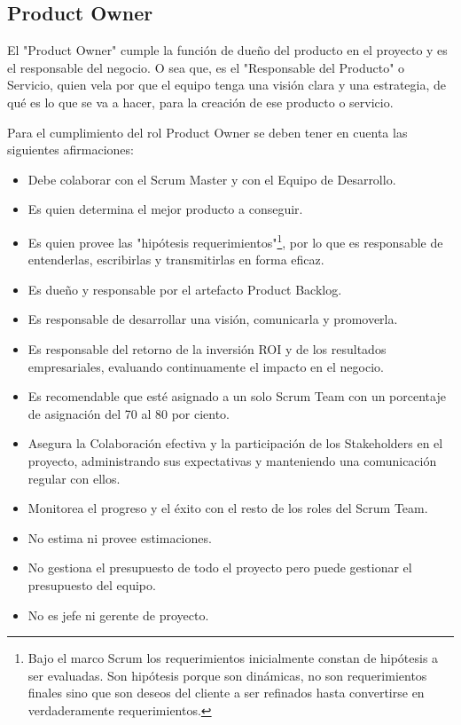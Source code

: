 \subsection{Product Owner}

El "Product Owner" cumple la función de dueño del producto en el proyecto y es el responsable del negocio. O sea que, es el "Responsable del Producto" o Servicio, quien vela por que el equipo tenga una visión clara y una estrategia, de qué es lo que se va a hacer, para la creación de ese producto o servicio.

Para el cumplimiento del rol Product Owner se deben tener en cuenta las siguientes afirmaciones:

\begin{itemize}
\item Debe colaborar con el Scrum Master y con el Equipo de Desarrollo.
\item Es quien determina el mejor producto a conseguir.
\item Es quien provee las "hipótesis requerimientos"\footnote{Bajo el marco Scrum los requerimientos inicialmente constan de hipótesis a ser evaluadas. Son hipótesis porque son dinámicas, no son requerimientos finales sino que son deseos del cliente a ser refinados hasta convertirse en verdaderamente requerimientos.}, por lo que es responsable de entenderlas, escribirlas y transmitirlas en forma eficaz.
\item Es dueño y responsable por el artefacto Product Backlog.
\item Es responsable de desarrollar una visión, comunicarla y promoverla.
\item Es responsable del retorno de la inversión ROI y de los resultados empresariales, evaluando continuamente el impacto en el negocio.
\item Es recomendable que esté asignado a un solo Scrum Team con un porcentaje de asignación del 70 al 80 por ciento.
\item Asegura la Colaboración efectiva y la participación de los Stakeholders en el proyecto, administrando sus expectativas y manteniendo una comunicación regular con ellos.
\item Monitorea el progreso y el éxito con el resto de los roles del Scrum Team.
\item No estima ni provee estimaciones.
\item No gestiona el presupuesto de todo el proyecto pero puede gestionar el presupuesto del equipo.
\item No es jefe ni gerente de proyecto.
\end{itemize}

